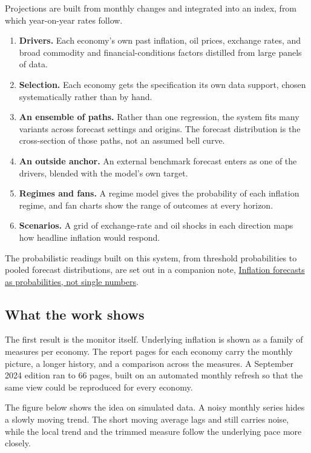 \documentclass[
  british,
  a4paper,
]{article}
\providecommand{\tightlist}{%
  \setlength{\itemsep}{0pt}\setlength{\parskip}{0pt}}
\begin{document}
Projections are built from monthly changes and integrated into an index,
from which year-on-year rates follow.

\begin{enumerate}
\def\labelenumi{\arabic{enumi}.}
\tightlist
\item
  \textbf{Drivers.} Each economy's own past inflation, oil prices,
  exchange rates, and broad commodity and financial-conditions factors
  distilled from large panels of data.
\item
  \textbf{Selection.} Each economy gets the specification its own data
  support, chosen systematically rather than by hand.
\item
  \textbf{An ensemble of paths.} Rather than one regression, the system
  fits many variants across forecast settings and origins. The forecast
  distribution is the cross-section of those paths, not an assumed bell
  curve.
\item
  \textbf{An outside anchor.} An external benchmark forecast enters as
  one of the drivers, blended with the model's own target.
\item
  \textbf{Regimes and fans.} A regime model gives the probability of
  each inflation regime, and fan charts show the range of outcomes at
  every horizon.
\item
  \textbf{Scenarios.} A grid of exchange-rate and oil shocks in each
  direction maps how headline inflation would respond.
\end{enumerate}

The probabilistic readings built on this system, from threshold
probabilities to pooled forecast distributions, are set out in a
companion note,
\href{../inflation-forecast-probabilities/index.html}{Inflation
forecasts as probabilities, not single numbers}.

\subsection{What the work shows}\label{what-the-work-shows}

The first result is the monitor itself. Underlying inflation is shown as
a family of measures per economy. The report pages for each economy
carry the monthly picture, a longer history, and a comparison across the
measures. A September 2024 edition ran to 66 pages, built on an
automated monthly refresh so that the same view could be reproduced for
every economy.

The figure below shows the idea on simulated data. A noisy monthly
series hides a slowly moving trend. The short moving average lags and
still carries noise, while the local trend and the trimmed measure
follow the underlying pace more closely.
\end{document}
